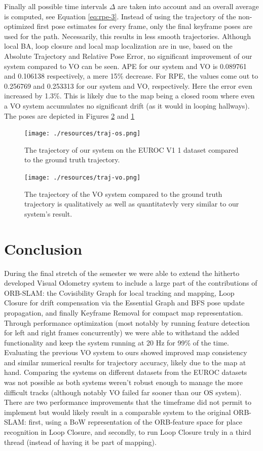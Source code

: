 \documentclass[a4paper, 10pt]{article}
\begin{document}
Finally all possible time intervals \(\Delta\) are taken into account and an overall average is computed, see Equation \ref{eq:rpe-3}.
Instead of using the trajectory of the non-optimized first pose estimates for every frame, only the final keyframe poses are used for the path.
Necessarily, this results in less smooth trajectories. Although local BA, loop closure and local map localization are in use, based on the Absolute Trajectory and Relative Pose Error, no significant improvement of 
our system compared to VO can be seen.
APE for our system and VO is 0.089761 and 0.106138 respectively, a mere 15\% decrease. For RPE, the values come out to 0.256769 and 0.253313 for our system and VO, respectively.
Here the error even increased by 1.3\%.
This is likely due to the map being a closed room where even a VO system accumulates no significant drift (as it would in looping hallways). The poses are depicted in Figures \ref{fig:org017330f} and \ref{fig:orgfea4b18}

\begin{figure}[htbp]
\centering
\texttt{[image: ./resources/traj-os.png]}
\caption{\label{fig:orgfea4b18}
The trajectory of our system on the EUROC V1 1 dataset compared to the ground truth trajectory.}
\end{figure}

\begin{figure}[htbp]
\centering
\texttt{[image: ./resources/traj-vo.png]}
\caption{\label{fig:org017330f}
The trajectory of the VO system compared to the ground truth trajectory is qualitatively as well as quantitatevly very similar to our system's result.}
\end{figure}

\section{Conclusion}
\label{sec:org8df3246}
During the final stretch of the semester we were able to extend the hitherto developed Visual Odometry system to include a large part of the contributions of ORB-SLAM: the Covisibility Graph for local tracking
and mapping, Loop Closure for drift compensation via the Essential Graph and BFS pose update propagation, and finally Keyframe Removal for compact map representation. Through performance optimization (most notably
by running feature detection for left and right frames concurrently) we were able to withstand the added functionality and keep the system running at 20 Hz for 99\% of the time. 
Evaluating the previous VO system to ours showed improved map consistency and similar numerical results for trajectory accuracy, 
likely due to the map at hand. Comparing the systems on different datasets from the EUROC datasets was not possible as both systems weren't robust enough
to manage the more difficult tracks (although notably VO failed far sooner than our OS system). There are two performance improvements that the timeframe did not permit to implement but would likely result in a comparable
system to the original ORB-SLAM: first, using a BoW representation of the ORB-feature space for place recognition in Loop Closure, and secondly, to run Loop Closure truly in a third thread (instead of having it be part
of mapping).




\end{document}
